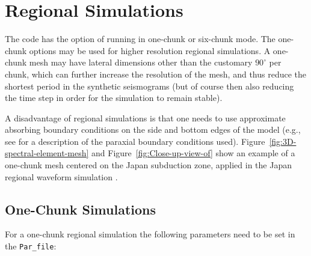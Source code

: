 \chapter{Regional Simulations}\label{cha:Regional-Simulations}


The code has the option of running in one-chunk or six-chunk mode.
The one-chunk options may be used for higher resolution regional
simulations. A one-chunk mesh may have lateral dimensions other than
the customary $90^{\circ}$ per chunk, which can further increase
the resolution of the mesh, and thus reduce the shortest period in
the synthetic seismograms (but of course then also reducing the time
step in order for the simulation to remain stable).

A disadvantage of regional simulations is that one needs to use approximate absorbing
boundary conditions on the side and bottom edges of the model (e.g.,
see \citet{KoTr99} for a description of the paraxial boundary conditions
used). Figure~\vref{fig:3D-spectral-element-mesh} and Figure~\vref{fig:Close-up-view-of}
show an example of a one-chunk mesh centered on the Japan subduction
zone, applied in the Japan regional waveform simulation \citep{ChTrHeKa07}.


\section{One-Chunk Simulations}\label{sec:One-Chunk-Simulations}

For a one-chunk regional simulation the following parameters need
to be set in the \texttt{Par\_file}:

